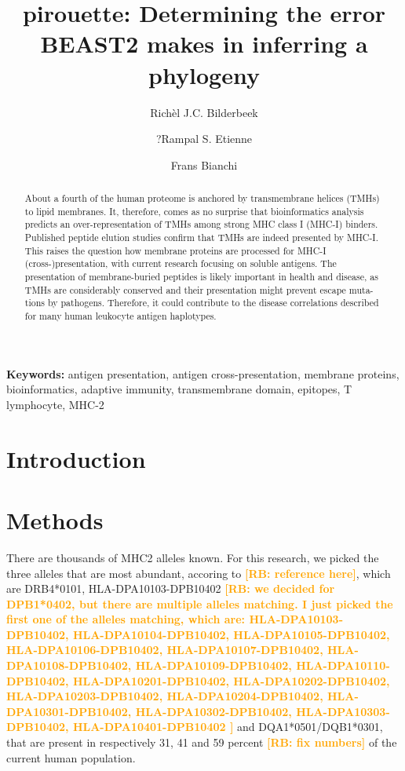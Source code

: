 \documentclass{article}
\title{pirouette: Determining the error BEAST2 makes in inferring a phylogeny}
\author[1]{Rich\`el J.C. Bilderbeek}
\author[1]{?Rampal S. Etienne}
\author[2]{Frans Bianchi}
\affil[1]{Groningen Institute for Evolutionary Life Sciences, University of Groningen, Groningen, The Netherlands}
\affil[2]{Frans' Institute, University of Groningen, Groningen, The Netherlands}
\newcommand{\richel}[1]{\textcolor{orange}{\textbf{[RB: #1]}}}
\begin{document}
\maketitle

\begin{abstract}

About a fourth of the human proteome is anchored by transmembrane helices (TMHs) to
lipid membranes. It, therefore, comes as no surprise that
bioinformatics analysis predicts an over-representation of TMHs among strong MHC
class I (MHC-I) binders. Published peptide elution studies confirm that TMHs are indeed
presented by MHC-I. This raises the question how membrane proteins are processed
for MHC-I (cross-)presentation, with current research focusing on soluble antigens. The
presentation of membrane-buried peptides is likely important in health and disease, as
TMHs are considerably conserved and their presentation might prevent escape muta-
tions by pathogens. Therefore, it could contribute to the disease correlations described
for many human leukocyte antigen haplotypes.

\end{abstract}

{\bf Keywords:} antigen presentation, antigen cross-presentation, membrane proteins, bioinformatics, adaptive
immunity, transmembrane domain, epitopes, T lymphocyte, MHC-2

\section{Introduction}

\cite{bianchi2017transmembrane}


\section{Methods}

There are thousands of MHC2 alleles known.
For this research, we picked the three alleles that are most abundant,
accoring to \richel{reference here}, 
which are DRB4*0101, 
HLA-DPA10103-DPB10402 
\richel{
  we decided for DPB1*0402, but there are multiple alleles matching.
  I just picked the first one of the alleles matching, which are:
  HLA-DPA10103-DPB10402,
  HLA-DPA10104-DPB10402,
  HLA-DPA10105-DPB10402,
  HLA-DPA10106-DPB10402,
  HLA-DPA10107-DPB10402,
  HLA-DPA10108-DPB10402,
  HLA-DPA10109-DPB10402,
  HLA-DPA10110-DPB10402,
  HLA-DPA10201-DPB10402,
  HLA-DPA10202-DPB10402,
  HLA-DPA10203-DPB10402,
  HLA-DPA10204-DPB10402,
  HLA-DPA10301-DPB10402,
  HLA-DPA10302-DPB10402,
  HLA-DPA10303-DPB10402,
  HLA-DPA10401-DPB10402
}
and DQA1*0501/DQB1*0301,
that are present in respectively 31, 41 and 59 percent 
\richel{fix numbers}
of the current human population.
\end{document}
